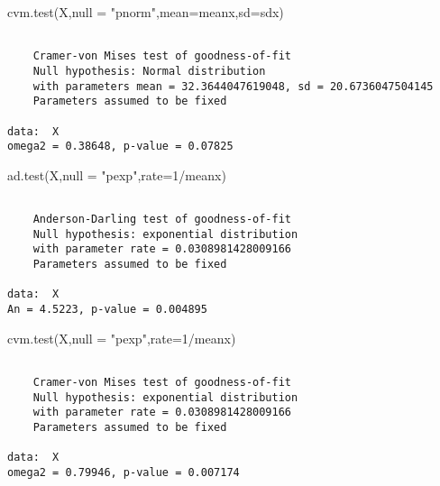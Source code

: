 \documentclass[
  a4paper,
  oneside,
  openany]{book}
\newenvironment{Shaded}{\begin{snugshade}}{\end{snugshade}}
\newcommand{\AttributeTok}[1]{\textcolor[rgb]{0.77,0.63,0.00}{#1}}
\newcommand{\DecValTok}[1]{\textcolor[rgb]{0.00,0.00,0.81}{#1}}
\newcommand{\FunctionTok}[1]{\textcolor[rgb]{0.00,0.00,0.00}{#1}}
\newcommand{\NormalTok}[1]{#1}
\newcommand{\SpecialCharTok}[1]{\textcolor[rgb]{0.00,0.00,0.00}{#1}}
\newcommand{\StringTok}[1]{\textcolor[rgb]{0.31,0.60,0.02}{#1}}
\begin{document}
\begin{Shaded}
\begin{Highlighting}[]
\FunctionTok{cvm.test}\NormalTok{(X,}\AttributeTok{null =} \StringTok{"pnorm"}\NormalTok{,}\AttributeTok{mean=}\NormalTok{meanx,}\AttributeTok{sd=}\NormalTok{sdx)}
\end{Highlighting}
\end{Shaded}

\begin{verbatim}

    Cramer-von Mises test of goodness-of-fit
    Null hypothesis: Normal distribution
    with parameters mean = 32.3644047619048, sd = 20.6736047504145
    Parameters assumed to be fixed

data:  X
omega2 = 0.38648, p-value = 0.07825
\end{verbatim}

\begin{Shaded}
\begin{Highlighting}[]
\FunctionTok{ad.test}\NormalTok{(X,}\AttributeTok{null =} \StringTok{"pexp"}\NormalTok{,}\AttributeTok{rate=}\DecValTok{1}\SpecialCharTok{/}\NormalTok{meanx)}
\end{Highlighting}
\end{Shaded}

\begin{verbatim}

    Anderson-Darling test of goodness-of-fit
    Null hypothesis: exponential distribution
    with parameter rate = 0.0308981428009166
    Parameters assumed to be fixed

data:  X
An = 4.5223, p-value = 0.004895
\end{verbatim}

\begin{Shaded}
\begin{Highlighting}[]
\FunctionTok{cvm.test}\NormalTok{(X,}\AttributeTok{null =} \StringTok{"pexp"}\NormalTok{,}\AttributeTok{rate=}\DecValTok{1}\SpecialCharTok{/}\NormalTok{meanx)}
\end{Highlighting}
\end{Shaded}

\begin{verbatim}

    Cramer-von Mises test of goodness-of-fit
    Null hypothesis: exponential distribution
    with parameter rate = 0.0308981428009166
    Parameters assumed to be fixed

data:  X
omega2 = 0.79946, p-value = 0.007174
\end{verbatim}
\end{document}
